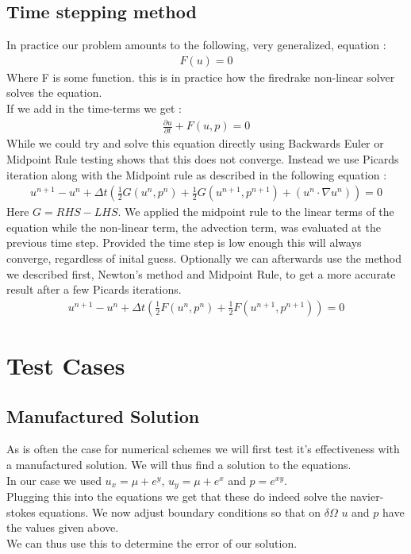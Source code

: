 \documentclass[11pt,twoside,a4paper]{article}
\begin{document}
\subsection{Time stepping method}
In practice our problem amounts to the following, very generalized, equation : 
\begin{align}
F(u) = 0
\end{align}
Where F is some function. this is in practice how the firedrake non-linear solver solves the equation.\\
If we add in the time-terms we get :
\begin{align}
\frac{\partial u}{\partial t} + F(u,p) = 0
\end{align}
While we could try and solve this equation directly using Backwards Euler or Midpoint Rule testing shows that this does not converge. Instead we use Picards iteration along with the Midpoint rule as described in the following equation :
\begin{align}
u^{n+1} - u^n + \Delta t (\frac{1}{2}G(u^n,p^n) + \frac{1}{2} G(u^{n+1},p^{n+1}) + ( u^n \cdot \nabla u^n) ) = 0
\end{align}
Here $G = RHS - LHS $. We applied the midpoint rule to the linear terms of the equation while the non-linear term, the advection term, was evaluated at the previous time step. Provided the time step is low enough this will always converge, regardless of inital guess.
Optionally we can afterwards use the method we described first, Newton's method and Midpoint Rule, to get a more accurate result after a few Picards iterations.
\begin{align}
u^{n+1} - u^n + \Delta t (\frac{1}{2}F(u^n,p^n) + \frac{1}{2} F(u^{n+1},p^{n+1})) = 0
\end{align}

\section{Test Cases}
\subsection{Manufactured Solution}

As is often the case for numerical schemes we will first test it's effectiveness with a manufactured solution. We will thus find a solution to the equations.\\
In our case we used $u_x = \mu  + e^y$, $u_y = \mu + e^x$ and $p = e^{xy}$.\\
Plugging this into the equations we get that these do indeed solve the navier-stokes equations. We now adjust boundary conditions so that on $\delta \Omega$ $u$ and $p$ have the values given above.\\
We can thus use this to determine the error of our solution.
\end{document}
